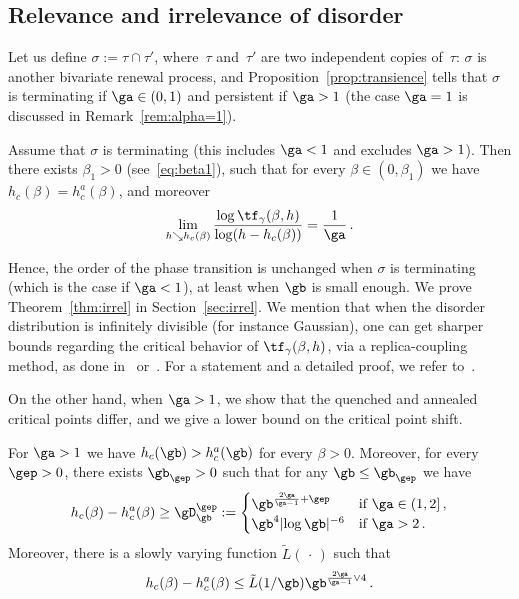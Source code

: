\subsection{Relevance and irrelevance of disorder}

Let us define $\sigma :=\tau \cap \tau'$, where~$\tau$ and~$\tau'$ are two independent copies of~$\tau$: $\sigma$ is another bivariate renewal process, and Proposition~\ref{prop:transience} tells that $\sigma$ is terminating if $\ga\in(0,1)$ and persistent if $\ga>1$ (the case $\ga=1$ is discussed in Remark~\ref{rem:alpha=1}).


\begin{theo}\label{thm:irrel}
Assume that $\sigma$ is terminating (this includes $\ga<1$ and excludes $\ga >1$). Then there exists $\beta_1>0$ (see~\eqref{eq:beta1}), such that for every $\beta \in (0,\beta_1)$ we have $h_c(\beta) = h_c^a(\beta)$, and moreover
\begin{equation}\label{eq:s2}
\lim_{h \searrow h_c(\beta)} \frac{\log \tf_{\gamma}(\beta,h)}{\log (h-h_c(\beta))} = \frac{1}{\ga}\,.
\end{equation}
\end{theo}

Hence, the order of the phase transition is unchanged when $\sigma$ is terminating (which is the case if $\ga<1$), at least when $\gb$ is small enough. We prove Theorem~\ref{thm:irrel} in Section~\ref{sec:irrel}. We mention that when the disorder distribution is infinitely divisible (for instance Gaussian), one can get sharper bounds regarding the critical behavior of $\tf_{\gamma}(\beta,h)$, via a replica-coupling method, as done in~\cite{cf:Ton08} or~\cite{cf:Wa12}. For a statement and a detailed proof, we refer to~\cite{cf:Khatib}.

On the other hand, when $\ga>1$, we show that the quenched and annealed critical points differ, and we give a lower bound on the critical point shift.

\begin{theo}\label{thm:rel}
For $\ga>1$ we have $h_c(\gb) > h_c^{a}(\gb)$ for every $\beta>0$. Moreover, for every $\gep>0$, there exists $\gb_{\gep}>0$ such that for any $\gb\leq \gb_\gep$ we have
\begin{equation}\label{eq:rel}
h_c(\beta) - h_c^{a}(\beta)\ge \gD_{\gb}^{\gep}:=
\begin{cases}
\gb^{\frac{2\ga}{\ga-1} +\gep} & \text{if } \ga\in(1,2]\,, \\
\gb^4 \mathopen|\log \gb |^{-6} & \text{if } \ga >2\,.
\end{cases}
\end{equation}
Moreover, there is a slowly varying function $\tilde{L}({\,\cdot\,})$ such that
\begin{equation}\label{eq:upb}
h_c(\beta) - h_c^a (\beta) \le
\tilde{L}(1/\gb) \gb^{\frac{2\ga}{\ga-1} \vee 4}\,.
\end{equation}
\end{theo}

